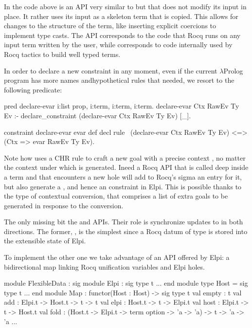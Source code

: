 \documentclass[a4paper, 11pt]{book}
\begin{document}
\noindent
In the code above  is an API
very similar to  but that does not modify
its input in place. It rather uses its input as a skeleton term that is
copied. This allows for changes to the structure of the term, like inserting
explicit coercions to implement type casts. The API corresponds to the code
that Rocq runs on any input term written by the user, while 
corresponds to code internally used by Rocq tactics to build well typed terms.

In order to declare a new  constraint in any moment, even if
the current $\lambda$Prolog program has more names andhypothetical rules
that needed, we resort to the following predicate:

\begin{elpicode}
pred declare-evar i:list prop, i:term, i:term, i:term.
declare-evar Ctx RawEv Ty Ev :-
  declare_constraint (declare-evar Ctx RawEv Ty Ev) [_].

constraint declare-evar evar def decl {
  rule \ (declare-evar Ctx RawEv Ty Ev)
     <=> (Ctx => evar RawEv Ty Ev).
}
\end{elpicode}

\noindent
Note how  uses a CHR rule to craft
a new goal with a precise context , no matter the context
under which  is generated. Ineed a Rocq API
that is called deep inside a term and that encounters a new hole
will add to Rocq's sigma an entry for it, but also generate a
, and hence an  constraint
in Elpi. This is possible thanks to the type of
contextual conversion, that comprises a list of extra goals to be
generated in response to the conversion.

The only missing bit the  and  APIs.
Their role is synchronize updates to  in both directions.
The former, , is the simplest since a Rocq
datum of type  is stored into the extensible state
of Elpi.

To implement the other one we take advantage of an API offered by Elpi:
a bidirectional map linking Rocq unification variables and Elpi holes.

\begin{ocamlcode}
module FlexibleData : sig
  module Elpi : sig type t ... end
  module type Host = sig type t ... end
  module Map : functor(Host : Host) -> sig
    type t
    val empty : t
    val add : Elpi.t -> Host.t -> t -> t
    val elpi   : Host.t -> t -> Elpi.t
    val host : Elpi.t -> t -> Host.t
    val fold : (Host.t -> Elpi.t -> term option -> 'a -> 'a) -> t -> 'a -> 'a
    ...
\end{ocamlcode}
\end{document}
